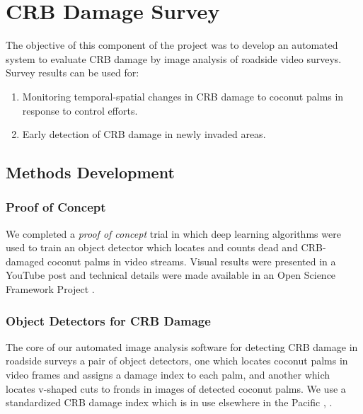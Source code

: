 \documentclass[12pt,letterpaper,english,bibliography=totocnumbered,abstract=on]{scrartcl}
\begin{document}
\newpage
\section{CRB Damage Survey}

The objective of this component of the project was to develop an automated system to evaluate CRB damage by image analysis of roadside video surveys.  Survey results can be used for:
\begin{enumerate}
	\item Monitoring temporal-spatial changes in CRB damage to coconut palms in response to control efforts.
	\item Early detection of CRB damage in newly invaded areas.
\end{enumerate}




\subsection{Methods Development}

\subsubsection{Proof of Concept}

We completed a \textit{proof of concept} trial in which deep learning algorithms were used to train an object detector which locates and counts dead and CRB-damaged coconut palms in video streams.  Visual results were presented in a YouTube post \parencite{moore_training_2019} and technical details were made available in an Open Science Framework Project \parencite{moore_open_2019}.

\subsubsection{Object Detectors for CRB Damage}

The core of our automated image analysis software for detecting CRB damage in roadside surveys a pair of object detectors, one which locates coconut palms in video frames and assigns a damage index to each palm, and another which locates v-shaped cuts to fronds in images of detected coconut palms. We use a standardized CRB damage index which is in use elsewhere in the Pacific \cite{jackson_rhinoceros_2019-1}, \cite{vaqalo_coconut_2017}.
\end{document}
